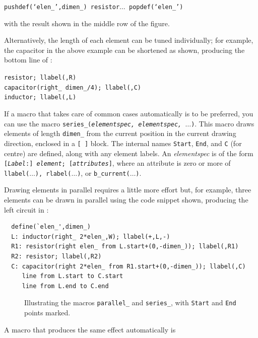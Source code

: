 {\tt pushdef(`elen\_',dimen\_)
 resistor$\ldots$ popdef(`elen\_')}

\noindent
with the result shown in the middle row of the figure.

Alternatively, the length of each element can be tuned individually; for
example, the capacitor in the above example can be shortened as shown,
producing the bottom line of :

{\tt resistor; llabel(,R)\\
 \hspace*{\parindent}%
  capacitor(right\_ dimen\_/4); llabel(,C)\\
 \hspace*{\parindent}%
  inductor; llabel(,L)}

If a macro that takes care of common cases automatically is to be preferred,
you can use the macro {\tt series\_({\sl elementspec, elementspec, $\ldots$})}.
This macro draws elements of length {\tt dimen\_} from the current
position in the current drawing
direction, enclosed in a {\tt [ ]} block.  The internal names
{\tt Start}, {\tt End}, and {\tt C} (for centre) are defined, along with
any element labels.  An {\sl elementspec} is of the form
{\tt[{\sl Label}:] {\sl element}; [{\sl attributes}]},
where an attribute is zero or more of
 {\tt llabel($\ldots$), rlabel($\ldots$)}, or {\tt b\_current($\ldots$)}.

Drawing elements in parallel requires a little more effort but, for example,
three elements can be drawn in parallel using the code snippet shown,
producing the left circuit in :
\begin{verbatim}
  define(`elen_',dimen_)
  L: inductor(right_ 2*elen_,W); llabel(+,L,-)
  R1: resistor(right elen_ from L.start+(0,-dimen_)); llabel(,R1)
  R2: resistor; llabel(,R2)
  C: capacitor(right 2*elen_ from R1.start+(0,-dimen_)); llabel(,C)
     line from L.start to C.start
     line from L.end to C.end
\end{verbatim}

\begin{figure}[H]
   
   \vspace*{-\baselineskip}
   \caption{Illustrating the macros {\tt parallel\_} and {\tt series\_},
       with {\tt Start} and {\tt End} points marked.}
   \label{ParSeries}
   \end{figure}

A macro that produces the same effect automatically is

